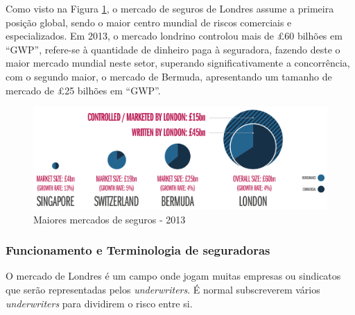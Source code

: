         
                
            Como visto na Figura \ref{fig:biggest-insurance-markets}, o mercado de seguros de Londres assume a primeira posição global, sendo o maior centro mundial de riscos comerciais e especializados. Em 2013, o mercado londrino controlou mais de £60 bilhões em ``GWP'', refere-se à quantidade de dinheiro paga à seguradora, fazendo deste o maior mercado mundial neste setor, superando significativamente a concorrência, com o segundo maior, o mercado de Bermuda, apresentando um tamanho de mercado de £25 bilhões em ``GWP''\cite{the-competitive-position-of-the-london-insurance-market,how-the-london-insurance-market-works}. %
        
            \begin{figure}[H]
                \centering
                \includegraphics[width=\textwidth]{imgs/Biggest_Insurance_Markets.png}
                    \caption{Maiores mercados de seguros - 2013}\label{fig:biggest-insurance-markets}
            \end{figure}

        \subsubsection{Funcionamento e Terminologia de seguradoras}\label{secsec:mercado-de-londres-tradicional}

            O mercado de Londres é um campo onde jogam muitas empresas ou sindicatos que serão representadas pelos \textit{underwriters}. É normal subscreverem vários \textit{underwriters} para dividirem o risco entre si.

